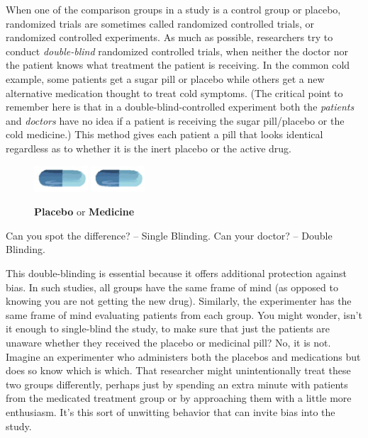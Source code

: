 \documentclass[11pt, chapterprefix=true]{scrbook}\usepackage[]{graphicx}\usepackage[]{color}
\begin{document}
When one of the comparison groups in a study is a control group or placebo, randomized trials are sometimes called randomized controlled trials, or randomized controlled experiments. As much as possible, researchers try to conduct \textit{double-blind} randomized controlled trials, when neither the doctor nor the patient knows what treatment the patient is receiving.  In the common cold example, some patients get a sugar pill or placebo while others get a new alternative medication thought to treat cold symptoms.  (The critical point to remember here is that in a double-blind-controlled experiment both the \textit{patients} and \textit{doctors} have no idea if a patient is receiving the sugar pill/placebo or the cold medicine.) This method gives each patient a pill that looks identical regardless as to whether it is the inert placebo or the active drug.


\begin{figure}[ht]
   \centering
   \includegraphics[width=2cm]{chapters/Chapter_5/ext_figure/placebo.png}
   \includegraphics[width=2cm]{chapters/Chapter_5/ext_figure/medicine.png}
    \caption{\textbf{Placebo} or \textbf{Medicine}}
\end{figure}

Can you spot the difference? -- Single Blinding.  Can your doctor? -- Double Blinding. 

This double-blinding is essential because it offers additional protection against bias. In such studies, all groups have the same frame of mind (as opposed to knowing you are not getting the new drug). Similarly, the experimenter has the same frame of mind evaluating patients from each group. You might wonder, isn't it enough to single-blind the study, to make sure that just the patients are unaware whether they received the placebo or medicinal pill? No, it is not. Imagine an experimenter who administers both the placebos and medications but does so know which is which. That researcher might unintentionally treat these two groups differently, perhaps just by spending an extra minute with patients from the medicated treatment group or by approaching them with a little more enthusiasm. It's this sort of unwitting behavior that can invite bias into the study.
\end{document}
